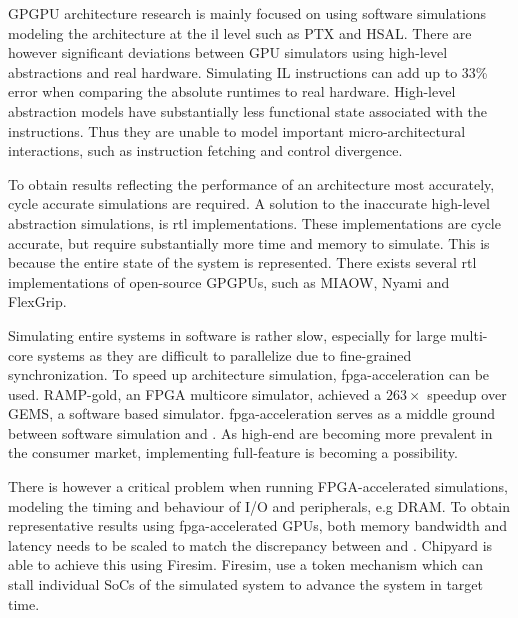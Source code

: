 GPGPU architecture research is mainly focused on using software simulations\cite{gem5_gpu}\cite{gpu_sim_cuda}\cite{multi2sim} modeling the architecture at the \acrfull{il} level such as PTX and HSAL. There are however significant deviations between GPU simulators using high-level abstractions and real hardware. Simulating IL instructions can add up to 33\% error when comparing the absolute runtimes to real hardware\cite{lost_in_abstraction}. High-level abstraction models have substantially less functional state associated with the instructions. Thus they are unable to model important micro-architectural interactions, such as instruction fetching and control divergence.

To obtain results reflecting the performance of an architecture most accurately, cycle accurate simulations are required. A solution to the inaccurate high-level abstraction simulations, is \acrfull{rtl} implementations. These implementations are cycle accurate, but require substantially more time and memory to simulate. This is because the entire state of the system is represented. There exists several \acrshort{rtl} implementations of open-source GPGPUs, such as MIAOW\cite{MIAOW}, Nyami\cite{Nyami} and FlexGrip\cite{FlexGrip}. 

Simulating entire systems in software is rather slow, especially for large multi-core systems as they are difficult to parallelize due to fine-grained synchronization\cite{graphite}\cite{wwt2}. To speed up architecture simulation, \acrshort{fpga}-acceleration can be used. RAMP-gold\cite{RAMP-gold}, an FPGA multicore simulator, achieved a $263\times$ speedup over GEMS\cite{gems}, a software based simulator. \acrshort{fpga}-acceleration serves as a middle ground between software simulation and . As high-end  are becoming more prevalent in the consumer market, implementing full-feature  is becoming a possibility.

There is however a critical problem when running FPGA-accelerated simulations, modeling the timing and behaviour of I/O and peripherals\cite{chipyard}, e.g DRAM. To obtain representative results using \acrshort{fpga}-accelerated GPUs, both memory bandwidth and latency needs to be scaled to match the discrepancy between  and . Chipyard\cite{chipyard} is able to achieve this using Firesim\cite{firesim}. Firesim, use a token mechanism which can stall individual SoCs of the simulated system to advance the system in target time. 

